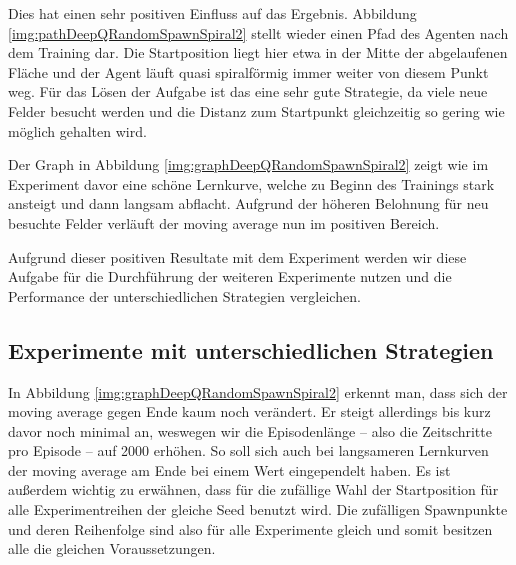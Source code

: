 Dies hat einen sehr positiven Einfluss auf das Ergebnis. Abbildung \ref{img:pathDeepQRandomSpawnSpiral2} stellt wieder einen Pfad des Agenten nach dem Training dar. Die Startposition liegt hier etwa in der Mitte der abgelaufenen Fläche und der Agent läuft quasi spiralförmig immer weiter von diesem Punkt weg. Für das Lösen der Aufgabe ist das eine sehr gute Strategie, da viele neue Felder besucht werden und die Distanz zum Startpunkt gleichzeitig so gering wie möglich gehalten wird.

Der Graph in Abbildung \ref{img:graphDeepQRandomSpawnSpiral2} zeigt wie im Experiment davor eine schöne Lernkurve, welche zu Beginn des Trainings stark ansteigt und dann langsam abflacht. Aufgrund der höheren Belohnung für neu besuchte Felder verläuft der moving average nun im positiven Bereich.

Aufgrund dieser positiven Resultate mit dem Experiment werden wir diese Aufgabe für die Durchführung der weiteren Experimente nutzen und die Performance der unterschiedlichen Strategien vergleichen.

% 

\subsection{Experimente mit unterschiedlichen Strategien}
In Abbildung \ref{img:graphDeepQRandomSpawnSpiral2} erkennt man, dass sich der moving average gegen Ende kaum noch verändert. Er steigt allerdings bis kurz davor noch minimal an, weswegen wir die Episodenlänge -- also die Zeitschritte pro Episode -- auf 2000 erhöhen. So soll sich auch bei langsameren Lernkurven der moving average am Ende bei einem Wert eingependelt haben. Es ist außerdem wichtig zu erwähnen, dass für die zufällige Wahl der Startposition für alle Experimentreihen der gleiche Seed benutzt wird. Die zufälligen Spawnpunkte und deren Reihenfolge sind also für alle Experimente gleich und somit besitzen alle die gleichen Voraussetzungen.

